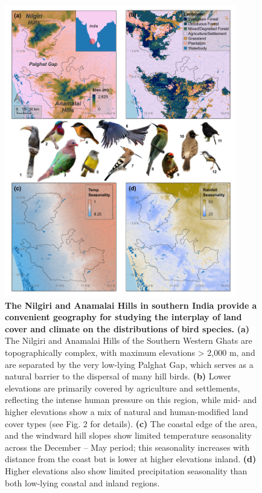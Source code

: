 \begin{figure}[t!]
    \centering
    \includegraphics[width=0.9\textwidth]{figures/hillybirds/fig_01.png}
    \caption{
        \textbf{The Nilgiri and Anamalai Hills in southern India provide a convenient geography for studying the interplay of land cover and climate on the distributions of bird species.}
        \textbf{(a)} The Nilgiri and Anamalai Hills of the Southern Western Ghats are topographically complex, with maximum elevations > 2,000 m, and are separated by the very low-lying Palghat Gap, which serves as a natural barrier to the dispersal of many hill birds. 
        \textbf{(b)} Lower elevations are primarily covered by agriculture and settlements, reflecting the intense human pressure on this region, while mid- and higher elevations show a mix of natural and human-modified land cover types (see Fig. 2 for details). 
        \textbf{(c)} The coastal edge of the area, and the windward hill slopes show limited temperature seasonality across the December -- May period; this seasonality increases with distance from the coast but is lower at higher elevations inland. 
        \textbf{(d)} Higher elevations also show limited precipitation seasonality than both low-lying coastal and inland regions. 
}
\end{figure}
